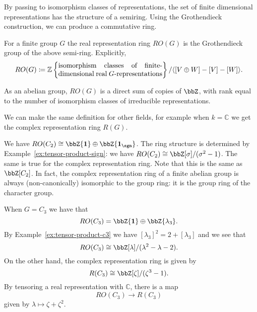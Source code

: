 \documentclass{willowtreebook}
\begin{document}
\begin{remark}
    By passing to isomorphism classes of representations, the set of finite dimensional representations has the structure of a semiring. Using the Grothendieck construction, we can produce a commutative ring. 
\end{remark}
\begin{definition}
    For a finite group $G$ the real representation ring $RO(G)$ is the Grothendieck group of the above semi-ring. Explicitly,
    \[
RO(G) \coloneqq \mathbb{Z}\left\{ \parbox{15em}{isomorphism classes of finite-dimensional real $G$-representations} \right\}/\langle [ V \oplus W] - [V] - [W] \rangle .
    \]
\end{definition}
\begin{remark}
    As an abelian group, $RO(G)$ is a direct sum of copies of $\bbZ$, with rank equal to the number of isomorphism classes of irreducible representations. 
\end{remark}
\begin{remark}
    We can make the same definition for other fields, for example when $k = \mathbb{C}$ we get the complex representation ring $R(G)$. 
\end{remark}
\begin{example}
    We have $RO(C_2) \cong \bbZ\{ \mathbf{1} \} \oplus \bbZ\{\mathbf{1}_{\sgn}\}$. The ring structure is determined by Example~\eqref{ex:tensor-product-sign}: we have $RO(C_2) \cong \bbZ[\sigma]/(\sigma^2-1)$. The same is true for the complex representation ring. Note that this is the same as $\bbZ[C_2]$. In fact, the complex representation ring of a finite abelian group is always (non-canonically) isomorphic to the group ring: it is the group ring of the character group. 
\end{example}
\begin{example}
    When $G = C_3$ we have that
    \[
RO(C_3) = \bbZ\{ \mathbf{1} \} \oplus \bbZ\{ \lambda_3 \}. 
    \]
    By Example~\eqref{ex:tensor-product-c3} we have $[\lambda_3]^2 = 2 + [\lambda_3]$ and we see that
    \[
RO(C_3) \cong \bbZ[\lambda]/(\lambda^2-\lambda-2). 
    \]
    On the other hand, the complex representation ring is given by \[
    R(C_3) \cong \bbZ[\zeta]/(\zeta^3-1).
    \]
    By tensoring a real representation with $\mathbb{C}$, there is a map
    \[
RO(C_3) \to R(C_3)
    \]
    given by $\lambda \mapsto \zeta + \zeta^2$. 
\end{example}

\par\bigskip\noindent

\end{document}
